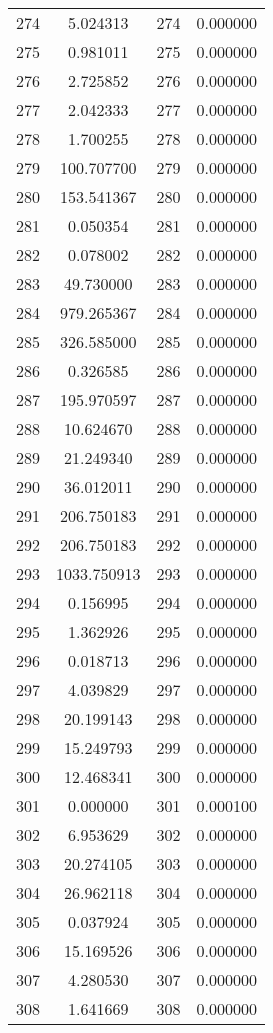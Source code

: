 \documentclass[12pt]{article}
\begin{document}
\begin{longtable}{@{}cccc@{}}
274 & 5.024313 & 274 & 0.000000 \\
275 & 0.981011 & 275 & 0.000000 \\
276 & 2.725852 & 276 & 0.000000 \\
277 & 2.042333 & 277 & 0.000000 \\
278 & 1.700255 & 278 & 0.000000 \\
279 & 100.707700 & 279 & 0.000000 \\
280 & 153.541367 & 280 & 0.000000 \\
281 & 0.050354 & 281 & 0.000000 \\
282 & 0.078002 & 282 & 0.000000 \\
283 & 49.730000 & 283 & 0.000000 \\
284 & 979.265367 & 284 & 0.000000 \\
285 & 326.585000 & 285 & 0.000000 \\
286 & 0.326585 & 286 & 0.000000 \\
287 & 195.970597 & 287 & 0.000000 \\
288 & 10.624670 & 288 & 0.000000 \\
289 & 21.249340 & 289 & 0.000000 \\
290 & 36.012011 & 290 & 0.000000 \\
291 & 206.750183 & 291 & 0.000000 \\
292 & 206.750183 & 292 & 0.000000 \\
293 & 1033.750913 & 293 & 0.000000 \\
294 & 0.156995 & 294 & 0.000000 \\
295 & 1.362926 & 295 & 0.000000 \\
296 & 0.018713 & 296 & 0.000000 \\
297 & 4.039829 & 297 & 0.000000 \\
298 & 20.199143 & 298 & 0.000000 \\
299 & 15.249793 & 299 & 0.000000 \\
300 & 12.468341 & 300 & 0.000000 \\
301 & 0.000000 & 301 & 0.000100 \\
302 & 6.953629 & 302 & 0.000000 \\
303 & 20.274105 & 303 & 0.000000 \\
304 & 26.962118 & 304 & 0.000000 \\
305 & 0.037924 & 305 & 0.000000 \\
306 & 15.169526 & 306 & 0.000000 \\
307 & 4.280530 & 307 & 0.000000 \\
308 & 1.641669 & 308 & 0.000000 \\

\end{longtable}
\end{document}
